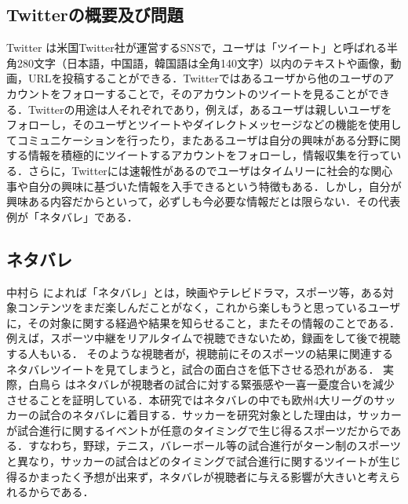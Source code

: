 \subsection{Twitterの概要及び問題}
Twitter \cite{Twitter}は米国Twitter社が運営するSNSで，ユーザは「ツイート」と呼ばれる半角280文字（日本語，中国語，韓国語は全角140文字）以内のテキストや画像，動画，URLを投稿することができる．Twitterではあるユーザから他のユーザのアカウントをフォローすることで，そのアカウントのツイートを見ることができる．Twitterの用途は人それぞれであり，例えば，あるユーザは親しいユーザをフォローし，そのユーザとツイートやダイレクトメッセージなどの機能を使用してコミュニケーションを行ったり，またあるユーザは自分の興味がある分野に関する情報を積極的にツイートするアカウントをフォローし，情報収集を行っている．さらに，Twitterには速報性があるのでユーザはタイムリーに社会的な関心事や自分の興味に基づいた情報を入手できるという特徴もある．しかし，自分が興味ある内容だからといって，必ずしも今必要な情報だとは限らない．その代表例が「ネタバレ」である．

\subsection{ネタバレ}
中村ら \cite{中村}によれば「ネタバレ」とは，映画やテレビドラマ，スポーツ等，ある対象コンテンツをまだ楽しんだことがなく，これから楽しもうと思っているユーザに，その対象に関する経過や結果を知らせること，またその情報のことである．例えば，スポーツ中継をリアルタイムで視聴できないため，録画をして後で視聴する人もいる．%
そのような視聴者が，視聴前にそのスポーツの結果に関連するネタバレツイートを見てしまうと，試合の面白さを低下させる恐れがある．
実際，白鳥ら \cite{白鳥1}はネタバレが視聴者の試合に対する緊張感や一喜一憂度合いを減少させることを証明している．本研究ではネタバレの中でも欧州4大リーグのサッカーの試合のネタバレに着目する．サッカーを研究対象とした理由は，サッカーが試合進行に関するイベントが任意のタイミングで生じ得るスポーツだからである．すなわち，野球，テニス，バレーボール等の試合進行がターン制のスポーツと異なり，サッカーの試合はどのタイミングで試合進行に関するツイートが生じ得るかまったく予想が出来ず，ネタバレが視聴者に与える影響が大きいと考えられるからである．

